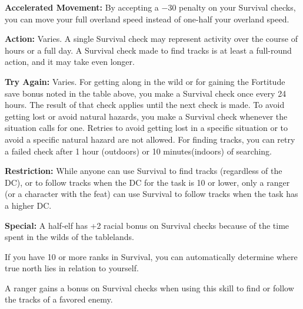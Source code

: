 
\textbf{Accelerated Movement:} By accepting a $-30$ penalty on your Survival checks, you can move your full overland speed instead of one-half your overland speed.

\textbf{Action:} Varies. A single Survival check may represent activity over the course of hours or a full day. A Survival check made to find tracks is at least a full-round action, and it may take even longer.

\textbf{Try Again:} Varies. For getting along in the wild or for gaining the Fortitude save bonus noted in the table above, you make a Survival check once every 24 hours. The result of that check applies until the next check is made. To avoid getting lost or avoid natural hazards, you make a Survival check whenever the situation calls for one. Retries to avoid getting lost in a specific situation or to avoid a specific natural hazard are not allowed. For finding tracks, you can retry a failed check after 1 hour (outdoors) or 10 minutes(indoors) of searching.

\textbf{Restriction:} While anyone can use Survival to find tracks (regardless of the DC), or to follow tracks when the DC for the task is 10 or lower, only a ranger (or a character with the  feat) can use Survival to follow tracks when the task has a higher DC.

\textbf{Special:} A half-elf has +2 racial bonus on Survival checks because of the time spent in the wilds of the tablelands.

If you have 10 or more ranks in Survival, you can automatically determine where true north lies in relation to yourself.

A ranger gains a bonus on Survival checks when using this skill to find or follow the tracks of a favored enemy.


